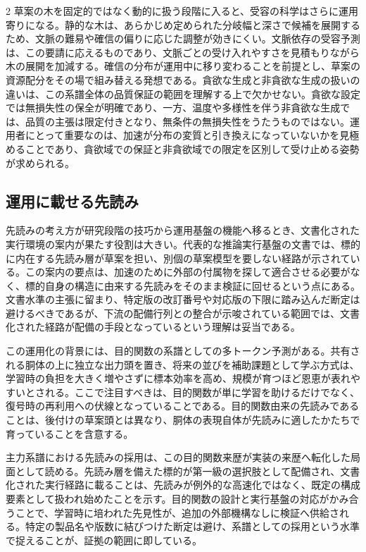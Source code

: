 \documentclass[lualatex,a4paper,10pt]{jlreq}
\begin{document}
\begin{multicols}{2}
草案の木を固定的ではなく動的に扱う段階に入ると、受容の科学はさらに運用寄りになる。静的な木は、あらかじめ定められた分岐幅と深さで候補を展開するため、文脈の難易や確信の偏りに応じた調整が効きにくい。文脈依存の受容予測は、この要請に応えるものであり、文脈ごとの受け入れやすさを見積もりながら木の展開を加減する\autocite{eagle2}。確信の分布が運用中に移り変わることを前提とし、草案の資源配分をその場で組み替える発想である。貪欲な生成と非貪欲な生成の扱いの違いは、この系譜全体の品質保証の範囲を理解する上で欠かせない。貪欲な設定では無損失性の保全が明確であり、一方、温度や多様性を伴う非貪欲な生成では、品質の主張は限定付きとなり、無条件の無損失性をうたうものではない\autocite{medusa}。運用者にとって重要なのは、加速が分布の変質と引き換えになっていないかを見極めることであり、貪欲域での保証と非貪欲域での限定を区別して受け止める姿勢が求められる。

\subsection{運用に載せる先読み}
先読みの考え方が研究段階の技巧から運用基盤の機能へ移るとき、文書化された実行環境の案内が果たす役割は大きい。代表的な推論実行基盤の文書では、標的に内在する先読み層が草案を担い、別個の草案模型を要しない経路が示されている\autocite{vllmmtp}。この案内の要点は、加速のために外部の付属物を探して適合させる必要がなく、標的自身の構造に由来する先読みをそのまま検証に回せるという点にある。文書水準の主張に留まり、特定版の改訂番号や対応版の下限に踏み込んだ断定は避けるべきであるが、下流の配備行列との整合が示唆されている範囲では、文書化された経路が配備の手段となっているという理解は妥当である。

この運用化の背景には、目的関数の系譜としての多トークン予測がある。共有される胴体の上に独立な出力頭を置き、将来の並びを補助課題として学ぶ方式は、学習時の負担を大きく増やさずに標本効率を高め、規模が育つほど恩恵が表れやすいとされる\autocite{mtp}。ここで注目すべきは、目的関数が単に学習を助けるだけでなく、復号時の再利用への伏線となっていることである。目的関数由来の先読みであることは、後付けの草案頭とは異なり、胴体の表現自体が先読みに適したかたちで育っていることを含意する。

主力系譜における先読みの採用は、この目的関数来歴が実装の来歴へ転化した局面として読める。先読み層を備えた標的が第一級の選択肢として配備され、文書化された実行経路に載ることは、先読みが例外的な高速化ではなく、既定の構成要素として扱われ始めたことを示す\autocite{vllmmtp}\autocite{mtp}。目的関数の設計と実行基盤の対応がかみ合うことで、学習時に培われた先見性が、追加の外部機構なしに検証へ供給される。特定の製品名や版数に結びつけた断定は避け、系譜としての採用という水準で捉えることが、証拠の範囲に即している。


\end{multicols}
\end{document}

